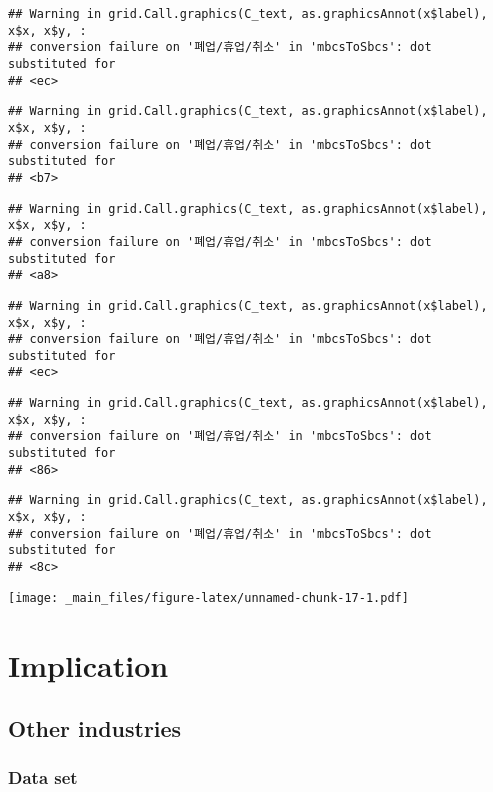 \documentclass[
]{book}
\begin{document}
\begin{verbatim}
## Warning in grid.Call.graphics(C_text, as.graphicsAnnot(x$label), x$x, x$y, :
## conversion failure on '폐업/휴업/취소' in 'mbcsToSbcs': dot substituted for
## <ec>
\end{verbatim}

\begin{verbatim}
## Warning in grid.Call.graphics(C_text, as.graphicsAnnot(x$label), x$x, x$y, :
## conversion failure on '폐업/휴업/취소' in 'mbcsToSbcs': dot substituted for
## <b7>
\end{verbatim}

\begin{verbatim}
## Warning in grid.Call.graphics(C_text, as.graphicsAnnot(x$label), x$x, x$y, :
## conversion failure on '폐업/휴업/취소' in 'mbcsToSbcs': dot substituted for
## <a8>
\end{verbatim}

\begin{verbatim}
## Warning in grid.Call.graphics(C_text, as.graphicsAnnot(x$label), x$x, x$y, :
## conversion failure on '폐업/휴업/취소' in 'mbcsToSbcs': dot substituted for
## <ec>
\end{verbatim}

\begin{verbatim}
## Warning in grid.Call.graphics(C_text, as.graphicsAnnot(x$label), x$x, x$y, :
## conversion failure on '폐업/휴업/취소' in 'mbcsToSbcs': dot substituted for
## <86>
\end{verbatim}

\begin{verbatim}
## Warning in grid.Call.graphics(C_text, as.graphicsAnnot(x$label), x$x, x$y, :
## conversion failure on '폐업/휴업/취소' in 'mbcsToSbcs': dot substituted for
## <8c>
\end{verbatim}

\texttt{[image: \_main\_files/figure-latex/unnamed-chunk-17-1.pdf]}

\hypertarget{implication}{%
\chapter{Implication}\label{implication}}

\hypertarget{other-industries}{%
\section{Other industries}\label{other-industries}}

\hypertarget{data-set-1}{%
\subsection{Data set}\label{data-set-1}}
\end{document}

